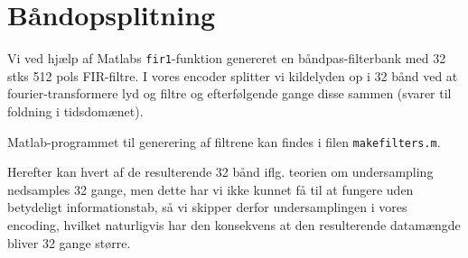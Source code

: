 \section{Båndopsplitning}
Vi ved hjælp af Matlabs \verb|fir1|-funktion genereret en båndpas-filterbank med 32 stks 512 pols FIR-filtre. I vores encoder splitter vi kildelyden op i 32 bånd ved at fourier-transformere lyd og filtre og efterfølgende gange disse sammen (svarer til foldning i tidsdomænet).

Matlab-programmet til generering af filtrene kan findes i filen \verb|makefilters.m|.

Herefter kan hvert af de resulterende 32 bånd iflg. teorien om undersampling nedsamples 32 gange, men dette har vi ikke kunnet få til at fungere uden betydeligt informationstab, så vi skipper derfor undersamplingen i vores encoding, hvilket naturligvis har den konsekvens at den resulterende datamængde bliver 32 gange større.
